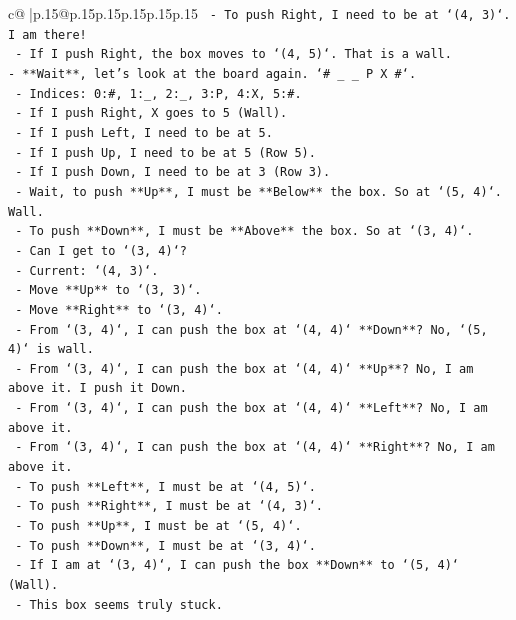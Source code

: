 \documentclass{article}
\begin{document}
{\begin{supertabular}{c@{$\;$}|p{.15\linewidth}@{}p{.15\linewidth}p{.15\linewidth}p{.15\linewidth}p{.15\linewidth}p{.15\linewidth}}
{{{\texttt{  {-} To push Right, I need to be at `(4, 3)`. I am there!} \\
\texttt{  {-} If I push Right, the box moves to `(4, 5)`. That is a wall.} \\
\texttt{{-} **Wait**, let's look at the board again. `\# \_ \_ P X \#`.} \\
\texttt{  {-} Indices: 0:\#, 1:\_, 2:\_, 3:P, 4:X, 5:\#.} \\
\texttt{  {-} If I push Right, X goes to 5 (Wall).} \\
\texttt{  {-} If I push Left, I need to be at 5.} \\
\texttt{  {-} If I push Up, I need to be at 5 (Row 5).} \\
\texttt{  {-} If I push Down, I need to be at 3 (Row 3).} \\
\texttt{  {-} Wait, to push **Up**, I must be **Below** the box. So at `(5, 4)`. Wall.} \\
\texttt{  {-} To push **Down**, I must be **Above** the box. So at `(3, 4)`.} \\
\texttt{  {-} Can I get to `(3, 4)`?} \\
\texttt{    {-} Current: `(4, 3)`.} \\
\texttt{    {-} Move **Up** to `(3, 3)`.} \\
\texttt{    {-} Move **Right** to `(3, 4)`.} \\
\texttt{    {-} From `(3, 4)`, I can push the box at `(4, 4)` **Down**? No, `(5, 4)` is wall.} \\
\texttt{    {-} From `(3, 4)`, I can push the box at `(4, 4)` **Up**? No, I am above it. I push it Down.} \\
\texttt{    {-} From `(3, 4)`, I can push the box at `(4, 4)` **Left**? No, I am above it.} \\
\texttt{    {-} From `(3, 4)`, I can push the box at `(4, 4)` **Right**? No, I am above it.} \\
\texttt{    {-} To push **Left**, I must be at `(4, 5)`.} \\
\texttt{    {-} To push **Right**, I must be at `(4, 3)`.} \\
\texttt{    {-} To push **Up**, I must be at `(5, 4)`.} \\
\texttt{    {-} To push **Down**, I must be at `(3, 4)`.} \\
\texttt{    {-} If I am at `(3, 4)`, I can push the box **Down** to `(5, 4)` (Wall).} \\
\texttt{    {-} This box seems truly stuck.} \\
\\ 
}}}
\end{supertabular}}
\end{document}
